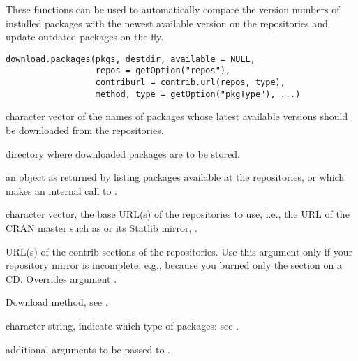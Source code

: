 %
\begin{Description}\relax
These functions can be used to automatically compare the version
numbers of installed packages with the newest available version on
the repositories and update outdated packages on the fly.
\end{Description}
%
\begin{Usage}
\begin{verbatim}
download.packages(pkgs, destdir, available = NULL,
                  repos = getOption("repos"),
                  contriburl = contrib.url(repos, type),
                  method, type = getOption("pkgType"), ...)
\end{verbatim}
\end{Usage}
%
\begin{Arguments}
\begin{ldescription}
\item[\code{pkgs}] 
character vector of the names of packages whose latest available
versions should be downloaded from the repositories.

\item[\code{destdir}] 
directory where downloaded packages are to be stored.

\item[\code{available}] 
an object as returned by 
listing packages available at the repositories, or  which
makes an internal call to .

\item[\code{repos}] 
character vector, the base URL(s) of the repositories
to use, i.e., the URL of the CRAN master such as
 or its Statlib mirror,
.

\item[\code{contriburl}] 
URL(s) of the contrib sections of the
repositories.  Use this argument only if your repository mirror is
incomplete, e.g., because you burned only the  section on a
CD.  Overrides argument .

\item[\code{method}] 
Download method, see .

\item[\code{type}] 
character string, indicate which type of packages: see
.

\item[\code{...}] 
additional arguments to be passed to
.

\end{ldescription}
\end{Arguments}
